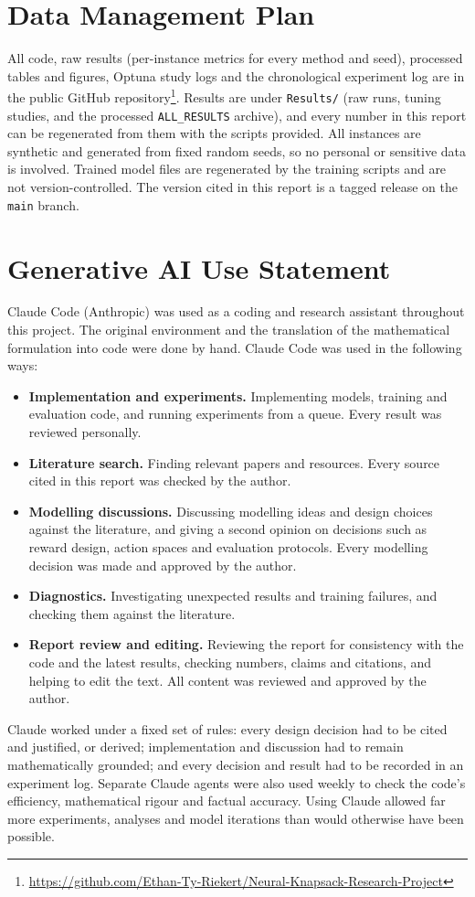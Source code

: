 \documentclass[12pt]{article}
\begin{document}
\section*{Data Management Plan}
All code, raw results (per-instance metrics for every method and seed), processed tables and figures, Optuna study logs and the chronological experiment log are in the public GitHub repository\footnote{\url{https://github.com/Ethan-Ty-Riekert/Neural-Knapsack-Research-Project}}. Results are under \texttt{Results/} (raw runs, tuning studies, and the processed \texttt{ALL\_RESULTS} archive), and every number in this report can be regenerated from them with the scripts provided. All instances are synthetic and generated from fixed random seeds, so no personal or sensitive data is involved. Trained model files are regenerated by the training scripts and are not version-controlled. The version cited in this report is a tagged release on the \texttt{main} branch.

\section*{Generative AI Use Statement}
Claude Code (Anthropic) was used as a coding and research assistant throughout this project. The original environment and the translation of the mathematical formulation into code were done by hand. Claude Code was used in the following ways:
\begin{itemize}
    \item \textbf{Implementation and experiments.} Implementing models, training and evaluation code, and running experiments from a queue. Every result was reviewed personally.
    \item \textbf{Literature search.} Finding relevant papers and resources. Every source cited in this report was checked by the author.
    \item \textbf{Modelling discussions.} Discussing modelling ideas and design choices against the literature, and giving a second opinion on decisions such as reward design, action spaces and evaluation protocols. Every modelling decision was made and approved by the author.
    \item \textbf{Diagnostics.} Investigating unexpected results and training failures, and checking them against the literature.
    \item \textbf{Report review and editing.} Reviewing the report for consistency with the code and the latest results, checking numbers, claims and citations, and helping to edit the text. All content was reviewed and approved by the author.
\end{itemize}
Claude worked under a fixed set of rules: every design decision had to be cited and justified, or derived; implementation and discussion had to remain mathematically grounded; and every decision and result had to be recorded in an experiment log. Separate Claude agents were also used weekly to check the code's efficiency, mathematical rigour and factual accuracy. Using Claude allowed far more experiments, analyses and model iterations than would otherwise have been possible.
\end{document}
